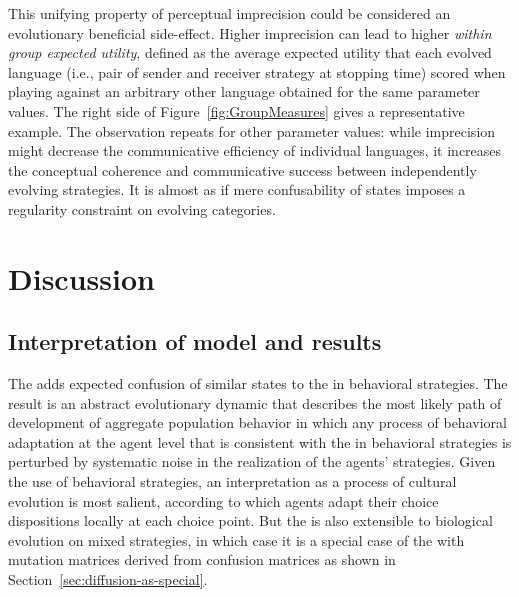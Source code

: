 \documentclass[fleqn,reqno,10pt]{article}
\newcommand{\rd}{\acro{rd}} %
\newcommand{\rmd}{\acro{rmd}} %
\newcommand{\rdd}{\acro{rdd}} %
\begin{document}
This unifying property of perceptual imprecision could be considered
an evolutionary beneficial side-effect. Higher imprecision can lead to
higher \emph{within group expected utility}, defined as the average
expected utility that each evolved language (i.e., pair of sender and
receiver strategy at stopping time) scored when playing against an
arbitrary other language obtained for the same parameter values. The
right side of Figure~\ref{fig:GroupMeasures} gives a representative
example. The observation repeats for other parameter values: while
imprecision might decrease the communicative efficiency of individual
languages, it increases the conceptual coherence and communicative
success between independently evolving strategies. It is almost as if
mere confusability of states imposes a regularity constraint on
evolving categories.


\section{Discussion}
\label{sec:discussion}

\subsection{Interpretation of model and results}
\label{sec:model-interpretation}

The \rdd adds expected confusion of similar states to the \rd in
behavioral strategies. The result is an abstract evolutionary dynamic
that describes the most likely path of development of aggregate
population behavior in which any process of behavioral adaptation at
the agent level that is consistent with the \rd in behavioral
strategies is perturbed by systematic noise in the realization of the
agents' strategies. Given the use of behavioral strategies, an
interpretation as a process of cultural evolution is most salient,
according to which agents adapt their choice dispositions locally at
each choice point. But the \rdd is also extensible to biological
evolution on mixed strategies, in which case it is a special case of
the \rmd with mutation matrices derived from confusion matrices as
shown in Section~\ref{sec:diffusion-as-special}. 
\end{document}
